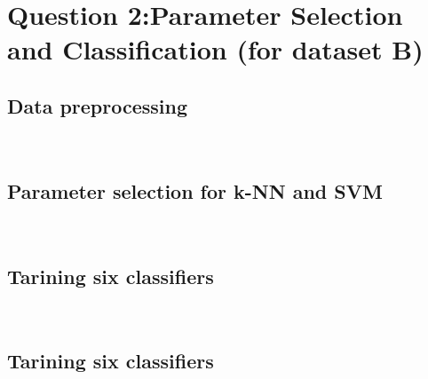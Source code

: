 \section{Question 2:Parameter Selection and Classification (for dataset B)}
\subsection{Data preprocessing}




\\
\subsection{Parameter selection for k-NN and SVM}



\\
\subsection{Tarining six classifiers}



\\
\subsection{Tarining six classifiers}





